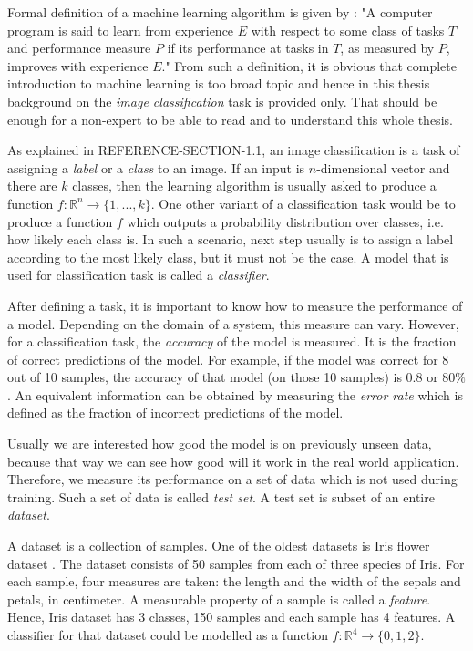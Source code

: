 Formal definition of a machine learning algorithm is given by \cite{Mitchell:1997:ML:541177}: "A computer program is said to learn from experience $E$ with respect to some class of tasks $T$ and performance measure $P$ if its performance at tasks in $T$, as measured by $P$, improves with experience $E$." 
From such a definition, it is obvious that complete introduction to machine learning is too broad topic and hence in this thesis background on the \textit{image classification} task is provided only. That should be enough for a non-expert to be able to read and to understand this whole thesis.

As explained in REFERENCE-SECTION-1.1, an image classification is a task of assigning a \textit{label} or a \textit{class} to an image. If an input is $n$-dimensional vector and there are $k$ classes, then the learning algorithm is usually asked to produce a function $f: \mathbb{R}^n \rightarrow \{1, ... , k\}$. One other variant of a classification task would be to produce a function $f$ which outputs a probability distribution over classes, i.e. how likely each class is. In such a scenario, next step usually is to assign a label according to the most likely class, but it must not be the case. A model that is used for classification task is called a \textit{classifier}.

After defining a task, it is important to know how to measure the performance of a model. Depending on the domain of a system, this measure can vary. However, for a classification task, the \textit{accuracy} of the model is measured. It is the fraction of correct predictions of the model. For example, if the model was correct for 8 out of 10 samples, the accuracy of that model (on those 10 samples) is $0.8$ or $80\%$. An equivalent information can be obtained by measuring the \textit{error rate} which is defined as the fraction of incorrect predictions of the model. 

Usually we are interested how good the model is on previously unseen data, because that way we can see how good will it work in the real world application. Therefore, we measure its performance on a set of data which is not used during training. Such a set of data is called \textit{test set}. A test set is subset of an entire \textit{dataset}.

A dataset is a collection of samples. One of the oldest datasets is Iris flower dataset \cite{iris-dataset}. The dataset consists of 50 samples from each of three species of Iris. For each sample, four measures are taken: the length and the width of the sepals and petals, in centimeter. A measurable property of a sample is called a \textit{feature}. Hence, Iris dataset has 3 classes, 150 samples and each sample has 4 features. A classifier for that dataset could be modelled as a function $f: \mathbb{R}^4 \rightarrow \{0, 1, 2\}$.

